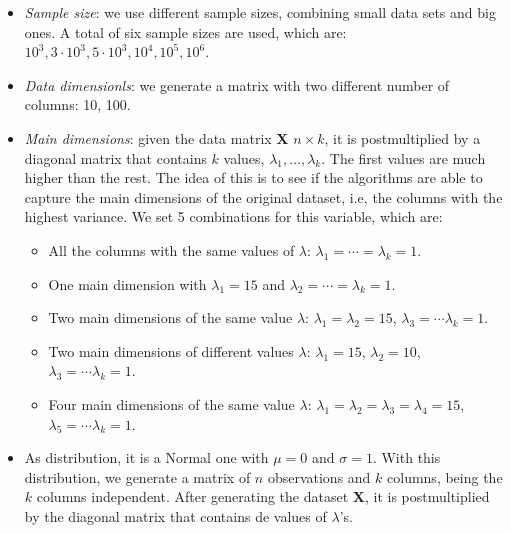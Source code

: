 \documentclass[11pt]{report}
\begin{document}
\begin{itemize}
\item \textit{Sample size}: we use different sample sizes, combining small
data sets and big ones. A total of six sample sizes are used, which are:
$10^3, 3\cdot 10^3, 5\cdot10^3, 10^4, 10^5, 10^6$.

\item \textit{Data dimensionls}: we generate a matrix with two different number 
of columns: 10, 100.

\item \textit{Main dimensions}: given the data matrix \textbf{X} $n \times k$,
it is postmultiplied by a diagonal matrix that contains $k$ values, 
$\lambda_1, \dots, \lambda_k$. The first values are much higher than the rest.
The idea of this is to see if the algorithms are able to capture the main
dimensions of the original dataset, i.e, the columns  with the highest variance. 
We set 5 combinations for this variable, which are:

\begin{itemize}
\item All the columns with the same values of $\lambda$: 
$\lambda_1 = \cdots = \lambda_k = 1$.

\item One main dimension with $\lambda_1 = 15$ and 
$\lambda_2 = \cdots = \lambda_k = 1$.

\item  Two main dimensions of the same value $\lambda$: 
$\lambda_1  = \lambda_2 = 15$, $\lambda_3 = \cdots \lambda_k = 1$.

\item  Two main dimensions of different values $\lambda$: 
$\lambda_1  = 15$, $\lambda_2 =10$, $\lambda_3 = \cdots \lambda_k = 1$.

\item  Four main dimensions of the same value $\lambda$: 
$\lambda_1  = \lambda_2 = \lambda_3 = \lambda_4 = 15$, $\lambda_5 = \cdots \lambda_k = 1$.


\end{itemize}

\item As distribution, it is a Normal one with $\mu = 0$ and 
$\sigma = 1$. With this distribution, we generate a matrix of $n$ observations
and $k$ columns, being the $k$ columns independent. After generating the 
dataset \textbf{X}, it is postmultiplied by the diagonal matrix that contains
de values of $\lambda$'s.


\end{itemize}
\end{document}
